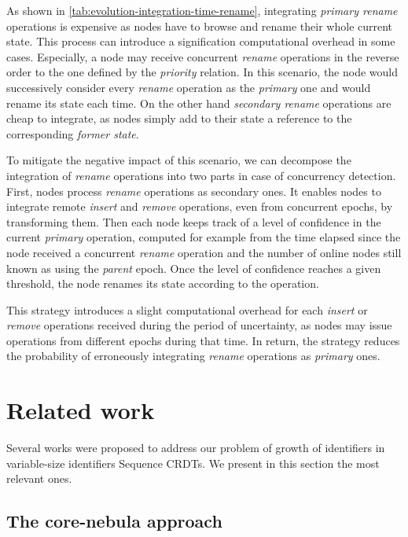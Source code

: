 \documentclass[10pt,journal,compsoc]{IEEEtran}
\begin{document}
As shown in \autoref{tab:evolution-integration-time-rename}, integrating \emph{primary rename} operations is expensive as nodes have to browse and rename their whole current state.
This process can introduce a signification computational overhead in some cases.
Especially, a node may receive concurrent \emph{rename} operations in the reverse order to the one defined by the \emph{priority} relation.
In this scenario, the node would successively consider every \emph{rename} operation as the \emph{primary} one and would rename its state each time.
On the other hand \emph{secondary rename} operations are cheap to integrate, as nodes simply add to their state a reference to the corresponding \emph{former state}.

To mitigate the negative impact of this scenario, we can decompose the integration of \emph{rename} operations into two parts in case of concurrency detection.
First, nodes process \emph{rename} operations as secondary ones.
It enables nodes to integrate remote \emph{insert} and \emph{remove} operations, even from concurrent epochs, by transforming them.
Then each node keeps track of a level of confidence in the current \emph{primary} operation, computed for example from the time elapsed since the node received a concurrent \emph{rename} operation and the number of online nodes still known as using the \emph{parent} epoch.
Once the level of confidence reaches a given threshold, the node renames its state according to the operation.

This strategy introduces a slight computational overhead for each \emph{insert} or \emph{remove} operations received during the period of uncertainty, as nodes may issue operations from different epochs during that time.
In return, the strategy reduces the probability of erroneously integrating \emph{rename} operations as \emph{primary} ones.

\section{Related work}
\label{sec:related-work}

Several works were proposed to address our problem of growth of identifiers in variable-size identifiers Sequence \acp{CRDT}.
We present in this section the most relevant ones.

\subsection{The core-nebula approach}
\end{document}
